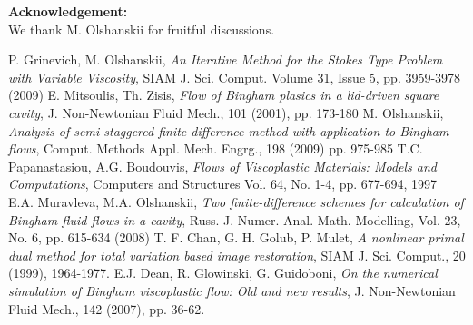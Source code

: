 \documentclass{report}
\begin{document}
\noindent \textbf{Acknowledgement:}\\
We thank M. Olshanskii for fruitful discussions.

\begin{thebibliography}{99}
P. Grinevich, M. Olshanskii, \textit{An Iterative Method for
the Stokes Type Problem with Variable Viscosity}, SIAM J. Sci. Comput.
Volume 31, Issue 5, pp. 3959-3978 (2009)
E. Mitsoulis, Th. Zisis, \textit{Flow of Bingham plasics in a
lid-driven square cavity}, J. Non-Newtonian Fluid Mech., 101 (2001), pp.
173-180
 M. Olshanskii, \textit{Analysis of semi-staggered
finite-difference method with application to Bingham flows}, Comput.
Methods Appl. Mech. Engrg., 198 (2009) pp. 975-985
T.C. Papanastasiou, A.G. Boudouvis, \textit{Flows of
Viscoplastic Materials: Models and Computations}, Computers and
Structures Vol. 64, No. 1-4, pp. 677-694, 1997
E.A. Muravleva, M.A. Olshanskii, \textit{Two finite-difference
schemes for calculation of Bingham fluid flows in a cavity}, Russ. J.
Numer. Anal. Math. Modelling, Vol. 23, No. 6, pp. 615-634 (2008)
T. F. Chan, G. H. Golub, P. Mulet, \textit{A nonlinear primal dual method
for total variation based image restoration}, SIAM J. Sci. Comput., 20 (1999), 1964-1977.
E.J. Dean, R. Glowinski, G. Guidoboni, \textit{On the
numerical simulation of Bingham viscoplastic flow: Old and new results},
J. Non-Newtonian Fluid Mech., 142 (2007), pp. 36-62.
\end{thebibliography}
\end{document}
